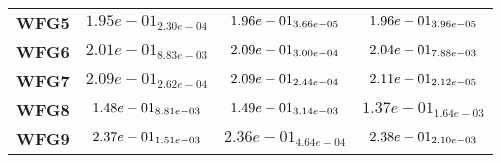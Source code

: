 \documentclass{article}
\begin{document}
\begin{table}[!htp]
\begin{scriptsize}
\begin{tabular}{c|ccc}
      \textbf{WFG5} & $1.95e-01_{2.30e-04} $ & $ \cellcolor{gray95} 1.96e-01_{3.66e-05} $ & $ \cellcolor{gray25} 1.96e-01_{3.96e-05}$ \\
      \textbf{WFG6} & $2.01e-01_{8.83e-03} $ & $ \cellcolor{gray95} 2.09e-01_{3.00e-04} $ & $ \cellcolor{gray25} 2.04e-01_{7.88e-03}$ \\
      \textbf{WFG7} & $2.09e-01_{2.62e-04} $ & $ \cellcolor{gray25} 2.09e-01_{2.44e-04} $ & $ \cellcolor{gray95} 2.11e-01_{2.12e-05}$ \\
      \textbf{WFG8} & $\cellcolor{gray25} 1.48e-01_{8.81e-03} $ & $ \cellcolor{gray95} 1.49e-01_{3.14e-03} $ & $ 1.37e-01_{1.64e-03}$ \\
      \textbf{WFG9} & $\cellcolor{gray25} 2.37e-01_{1.51e-03} $ & $ 2.36e-01_{4.64e-04} $ & $ \cellcolor{gray95} 2.38e-01_{2.10e-03}$ \\
  \end{tabular}
  \end{scriptsize}
\end{table}
\end{document}
